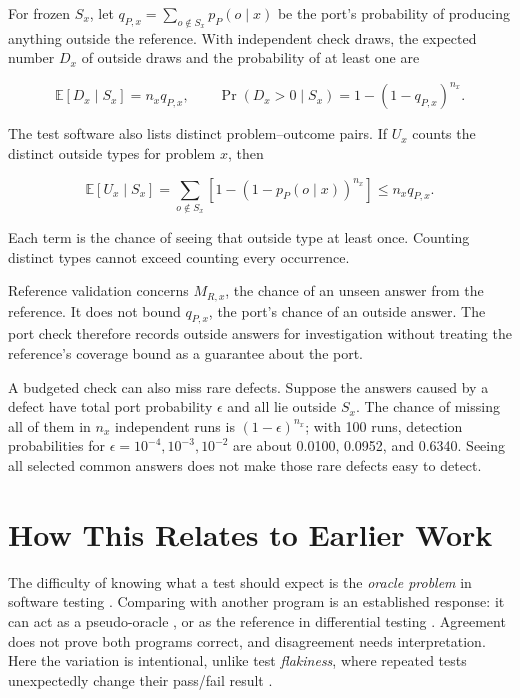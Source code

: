 \documentclass[10pt,letterpaper]{article}
\begin{document}
For frozen \(S_x\), let \(q_{P,x}=\sum_{o\notin S_x}p_P(o\mid x)\) be the port's
probability of producing anything outside the reference. With independent check draws, the
expected number \(D_x\) of outside draws and the probability of at least one are

\[
\mathbb E[D_x\mid S_x]=n_xq_{P,x},\qquad
\Pr(D_x>0\mid S_x)=1-(1-q_{P,x})^{n_x}.
\]

The test software also lists distinct problem--outcome pairs. If \(U_x\) counts the
distinct outside types for problem \(x\), then

\[
\mathbb E[U_x\mid S_x]
=\sum_{o\notin S_x}\left[1-(1-p_P(o\mid x))^{n_x}\right]
\le n_xq_{P,x}.
\]

Each term is the chance of seeing that outside type at least once. Counting distinct types
cannot exceed counting every occurrence.

Reference validation concerns \(M_{R,x}\), the chance of an unseen answer from the
reference. It does not bound \(q_{P,x}\), the port's chance of an outside answer. The port
check therefore records outside answers for investigation without treating the reference's
coverage bound as a guarantee about the port.

A budgeted check can also miss rare defects. Suppose the answers caused by a defect have
total port probability \(\epsilon\) and all lie outside \(S_x\). The chance of missing all
of them in \(n_x\) independent runs is \((1-\epsilon)^{n_x}\); with 100 runs, detection
probabilities for \(\epsilon=10^{-4},10^{-3},10^{-2}\) are about 0.0100, 0.0952, and
0.6340. Seeing all selected common answers does not make those rare defects easy to
detect.

\section{How This Relates to Earlier Work}\label{sec:related}

The difficulty of knowing what a test should expect is the \emph{oracle problem} in
software testing \citep{ref1, ref3, ref26}. Comparing with another program is an
established response: it can act as a pseudo-oracle \citep{ref2}, or as the reference in
differential testing \citep{ref4}. Agreement does not prove both programs correct, and
disagreement needs interpretation. Here the variation is intentional, unlike test
\emph{flakiness}, where repeated tests unexpectedly change their pass/fail result
\citep{ref17}.
\end{document}
